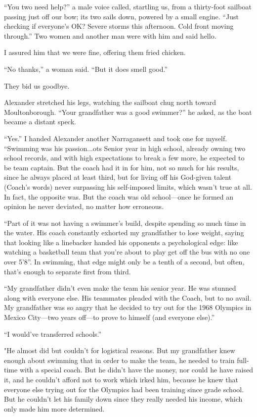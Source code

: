 ``You two need help?'' a male voice called, startling us, from a
thirty-foot sailboat passing just off our bow; its two sails down,
powered by a small engine. ``Just checking if everyone's OK? Severe
storms this afternoon. Cold front moving through.'' Two women and
another man were with him and said hello.

I assured him that we were fine, offering them fried chicken.

``No thanks,'' a woman said. ``But it does smell good.''

They bid us goodbye.

Alexander stretched his legs, watching the sailboat chug north toward
Moultonborough. ``Your grandfather was a good swimmer?'' he asked, as
the boat became a distant speck.

``Yes.'' I handed Alexander another Narragansett and took one for
myself. ``Swimming was his passion...ots Senior year in high school,
already owning two school records, and with high expectations to break a
few more, he expected to be team captain. But the coach had it in for
him, not so much for his results, since he always placed at least third,
but for living off his God-given talent (Coach's words) never surpassing
his self-imposed limits, which wasn't true at all. In fact, the opposite
was. But the coach was old school---once he formed an opinion he never
deviated, no matter how erroneous.

``Part of it was not having a swimmer's build, despite spending so much
time in the water. His coach constantly exhorted my grandfather to lose
weight, saying that looking like a linebacker handed his opponents a
psychological edge: like watching a basketball team that you're about to
play get off the bus with no one over 5'8''. In swimming, that edge
might only be a tenth of a second, but often, that's enough to separate
first from third.

``My grandfather didn't even make the team his senior year. He was
stunned along with everyone else. His teammates pleaded with the Coach,
but to no avail. My grandfather was so angry that he decided to try out
for the 1968 Olympics in Mexico City---two years off---to prove to
himself (and everyone else).''

``I would've transferred schools.''

"He almost did but couldn't for logistical reasons. But my grandfather
knew enough about swimming that in order to make the team, he needed to
train full-time with a special coach. But he didn't have the money, nor
could he have raised it, and he couldn't afford not to work which irked
him, because he knew that everyone else trying out for the Olympics had
been training since grade school. But he couldn't let his family down
since they really needed his income, which only made him more
determined.

